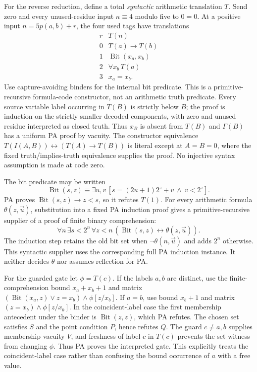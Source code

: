 For the reverse reduction, define a total \emph{syntactic} arithmetic
translation $T$. Send zero and every unused-residue input $n\equiv4$
modulo five to $0=0$. At a positive input $n=5p(a,b)+r$, the four
used tags have translations
\[
\begin{array}{c|l}
 r& T(n)\\\hline
 0&T(a)\to T(b)\\
 1&\operatorname{Bit}(x_a,x_b)\\
 2&\forall x_b\,T(a)\\
 3&x_a=x_b.
\end{array}
\]
Use capture-avoiding binders for the internal bit predicate. This is a
primitive-recursive formula-code constructor, not an arithmetic truth
predicate. Every source variable label occurring in $T(B)$ is strictly
below $B$; the proof is induction on the strictly smaller decoded
components, with zero and unused residue interpreted as closed truth.
Thus $x_B$ is absent from $T(B)$ and $\Gamma(B)$ has a uniform PA proof
by vacuity. The constructor equivalence
$T(I(A,B))\leftrightarrow(T(A)\to T(B))$ is literal except at
$A=B=0$, where the fixed truth/implies-truth equivalence supplies the
proof. No injective syntax assumption is made at code zero.

The bit predicate may be written
\[
 \operatorname{Bit}(s,z)\equiv
 \exists u,v\,[s=(2u+1)2^z+v\ \wedge\ v<2^z].
\]
PA proves $\operatorname{Bit}(s,z)\to z<s$, so it refutes $T(1)$.
For every arithmetic formula $\theta(z,\vec u)$, substitution into a
fixed PA induction proof gives a primitive-recursive supplier of a proof
of finite binary comprehension:
\[
 \forall n\,\exists s<2^n\,\forall z<n\,
       (\operatorname{Bit}(s,z)\leftrightarrow\theta(z,\vec u)).
\]
The induction step retains the old bit set when $\neg\theta(n,\vec u)$
and adds $2^n$ otherwise. This syntactic supplier uses the corresponding
full PA induction instance. It neither decides $\theta$ nor assumes
reflection for PA.

For the guarded gate let $\phi=T(c)$. If the labels $a,b$ are distinct,
use the finite-comprehension bound $x_a+x_b+1$ and matrix
$(\operatorname{Bit}(x_a,z)\vee z=x_b)\wedge\phi[z/x_b]$.
If $a=b$, use bound $x_b+1$ and matrix
$(z=x_b)\wedge\phi[z/x_b]$. In the coincident-label case the first
membership antecedent under the binder is $\operatorname{Bit}(z,z)$,
which PA refutes. The chosen set satisfies $S$ and the point condition
$P$, hence refutes $Q$. The guard $c\ne a,b$ supplies membership
vacuity $V$, and freshness of label $c$ in $T(c)$ prevents the set
witness from changing $\phi$. Thus PA proves the interpreted gate.
This explicitly treats the coincident-label case rather than confusing
the bound occurrence of $a$ with a free value.

